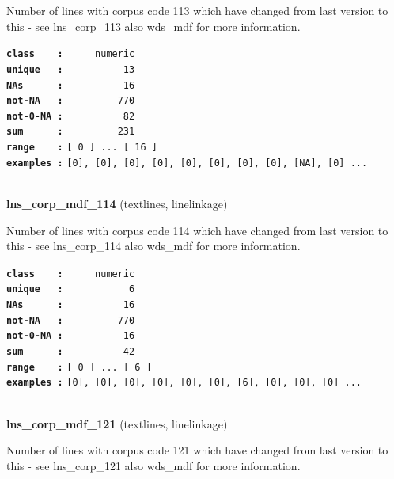 \documentclass[]{article}
\begin{document}
Number of lines with corpus code 113 which have changed from last
version to this - see lns\_corp\_113 also wds\_mdf for more information.

\textbf{\texttt{class\ \ \ \ :}} \texttt{~~~~~numeric}\\
\textbf{\texttt{unique\ \ \ :}} \texttt{~~~~~~~~~~13}\\
\textbf{\texttt{NAs\ \ \ \ \ \ :}} \texttt{~~~~~~~~~~16}\\
\textbf{\texttt{not-NA\ \ \ :}} \texttt{~~~~~~~~~770}\\
\textbf{\texttt{not-0-NA\ :}} \texttt{~~~~~~~~~~82}\\
\textbf{\texttt{sum\ \ \ \ \ \ :}} \texttt{~~~~~~~~~231}\\
\textbf{\texttt{range\ \ \ \ :}}
\texttt{{[}\ 0\ {]}\ ...\ {[}\ 16\ {]}}\\
\textbf{\texttt{examples\ :}}
\texttt{{[}0{]},\ {[}0{]},\ {[}0{]},\ {[}0{]},\ {[}0{]},\ {[}0{]},\ {[}0{]},\ {[}0{]},\ {[}NA{]},\ {[}0{]}\ ...}\\

~

\textbf{lns\_corp\_mdf\_114} (textlines, linelinkage)

Number of lines with corpus code 114 which have changed from last
version to this - see lns\_corp\_114 also wds\_mdf for more information.

\textbf{\texttt{class\ \ \ \ :}} \texttt{~~~~~numeric}\\
\textbf{\texttt{unique\ \ \ :}} \texttt{~~~~~~~~~~~6}\\
\textbf{\texttt{NAs\ \ \ \ \ \ :}} \texttt{~~~~~~~~~~16}\\
\textbf{\texttt{not-NA\ \ \ :}} \texttt{~~~~~~~~~770}\\
\textbf{\texttt{not-0-NA\ :}} \texttt{~~~~~~~~~~16}\\
\textbf{\texttt{sum\ \ \ \ \ \ :}} \texttt{~~~~~~~~~~42}\\
\textbf{\texttt{range\ \ \ \ :}}
\texttt{{[}\ 0\ {]}\ ...\ {[}\ 6\ {]}}\\
\textbf{\texttt{examples\ :}}
\texttt{{[}0{]},\ {[}0{]},\ {[}0{]},\ {[}0{]},\ {[}0{]},\ {[}0{]},\ {[}6{]},\ {[}0{]},\ {[}0{]},\ {[}0{]}\ ...}\\

~

\textbf{lns\_corp\_mdf\_121} (textlines, linelinkage)

Number of lines with corpus code 121 which have changed from last
version to this - see lns\_corp\_121 also wds\_mdf for more information.
\end{document}
